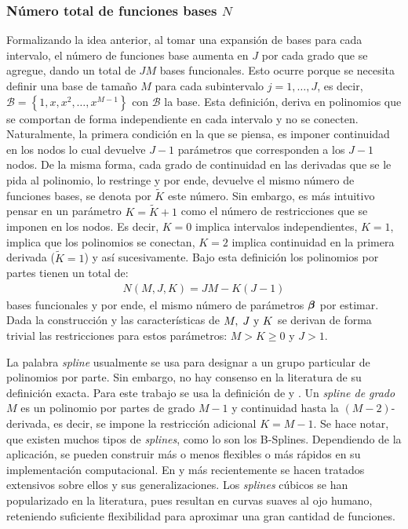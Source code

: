 \documentclass[../Main/Main.tex]{subfiles}
\begin{document}
\subsubsection*{Número total de funciones bases $N$}
Formalizando la idea anterior, al tomar una expansión de bases para cada intervalo, el número de funciones base aumenta en $J$ por cada grado que se agregue, dando un total de $JM$ bases funcionales. Esto ocurre porque se necesita definir una base de tamaño $M$ para cada subintervalo $j = 1,\ldots,J$, es decir, $\mathcal{B} = \left\{1,x,x^2,\ldots,x^{M-1}\right\}$ con $\mathcal{B}$ la base. Esta definición, deriva en polinomios que se comportan de forma independiente en cada intervalo y no se conecten. Naturalmente, la primera condición en la que se piensa, es imponer continuidad en los nodos lo cual devuelve $J-1$ parámetros que corresponden a los $J-1$ nodos. De la misma forma, cada grado de continuidad en las derivadas que se le pida al polinomio, lo restringe y por ende, devuelve el mismo número de funciones bases, se denota por $\tilde{K}$ este número. Sin embargo, es más intuitivo pensar en un parámetro $K = \tilde{K} + 1$ como el número de restricciones que se imponen en los nodos. Es decir, $K = 0$ implica intervalos independientes, $K = 1$, implica que los polinomios se conectan, $K = 2$ implica continuidad en la primera derivada ($\tilde{K} = 1$) y así sucesivamente. Bajo esta definición los polinomios por partes tienen un total de:
\begin{align}
	N(M,J,K) = JM - K(J-1) \label{ec:NEstrella}
\end{align}
bases funcionales y por ende, el mismo número de parámetros $\bm{\beta}$ por estimar. Dada la construcción y las características de $M,\;J\text{ y }K$ se derivan de forma trivial las restricciones para estos parámetros: $M > K \geq 0 $ y $J > 1$.

La palabra \textit{spline} usualmente se usa para designar a un grupo particular de polinomios por parte. Sin embargo, no hay consenso en la literatura de su definición exacta. Para este trabajo se usa la definición de \citet{wasserman2007all} y \citet{hastie2008elements}.  Un \textit{spline de grado $M$} es un polinomio por partes de grado $M-1$ y continuidad hasta la $(M-2)$-derivada, es decir, se impone la restricción adicional $K = M - 1$. Se hace notar, que existen muchos tipos de \textit{splines}, como lo son los B-Splines. Dependiendo de la aplicación, se pueden construir más o menos flexibles o más rápidos en su implementación computacional. En \citet{deboor1978splines} y más recientemente \citet{wahba1990splines} se hacen tratados extensivos sobre ellos y sus generalizaciones. Los \textit{splines} cúbicos se han popularizado en la literatura, pues resultan en curvas suaves al ojo humano, reteniendo suficiente flexibilidad para aproximar una gran cantidad de funciones.
\end{document}
